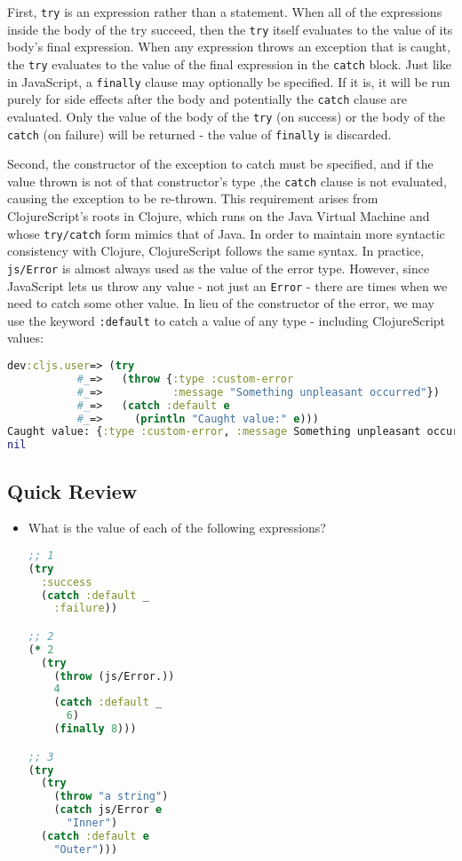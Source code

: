 \documentclass[10pt,twoside,openright]{memoir}
\begin{document}
First, \texttt{try} is an expression rather than a statement. When all
of the expressions inside the body of the try succeed, then the
\texttt{try} itself evaluates to the value of its body's final
expression. When any expression throws an exception that is caught, the
\texttt{try} evaluates to the value of the final expression in the
\texttt{catch} block. Just like in JavaScript, a \texttt{finally} clause
may optionally be specified. If it is, it will be run purely for side
effects after the body and potentially the \texttt{catch} clause are
evaluated. Only the value of the body of the \texttt{try} (on success)
or the body of the \texttt{catch} (on failure) will be returned - the
value of \texttt{finally} is discarded.

Second, the constructor of the exception to catch must be specified, and
if the value thrown is not of that constructor's type ,the
\texttt{catch} clause is not evaluated, causing the exception to be
re-thrown. This requirement arises from ClojureScript's roots in
Clojure, which runs on the Java Virtual Machine and whose \texttt{try/catch} form mimics
that of Java. In order to maintain more syntactic consistency with
Clojure, ClojureScript follows the same syntax. In practice,
\texttt{js/Error} is almost always used as the value of the error type.
However, since JavaScript lets us throw any value - not just an
\texttt{Error} - there are times when we need to catch some other value.
In lieu of the constructor of the error, we may use the keyword
\texttt{:default} to catch a value of any type - including ClojureScript
values:

\begin{lstlisting}[language=Clojure]
dev:cljs.user=> (try
           #_=>   (throw {:type :custom-error
           #_=>           :message "Something unpleasant occurred"})
           #_=>   (catch :default e
           #_=>     (println "Caught value:" e)))
Caught value: {:type :custom-error, :message Something unpleasant occurred}
nil
\end{lstlisting}


\subsection{Quick Review}

\begin{itemize}
\tightlist
\item What is the value of each of the following expressions?
\begin{lstlisting}[language=Clojure]
;; 1
(try
  :success
  (catch :default _
    :failure))

;; 2
(* 2
  (try
    (throw (js/Error.))
    4
    (catch :default _
      6)
    (finally 8)))

;; 3
(try
  (try
    (throw "a string")
    (catch js/Error e
      "Inner")
  (catch :default e
    "Outer")))
\end{lstlisting}
\end{itemize}
\end{document}
